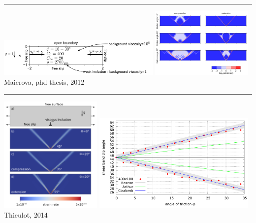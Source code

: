 \begin{center}\noindent\rule{8cm}{0.4pt}\end{center}

\begin{center}
\includegraphics[width=8cm]{images/benchmark_brick/maie12a}
\includegraphics[width=5cm]{images/benchmark_brick/maie12b}\\
{\small Maierova, phd thesis, 2012 \cite{maie12}}
\end{center}

\begin{center}\noindent\rule{8cm}{0.4pt}\end{center}

\begin{center}
\includegraphics[width=5cm]{images/benchmark_brick/thie14a}
\includegraphics[width=8cm]{images/benchmark_brick/thie14b}\\
{\small Thieulot, 2014 \cite{thie14}}
\end{center}

